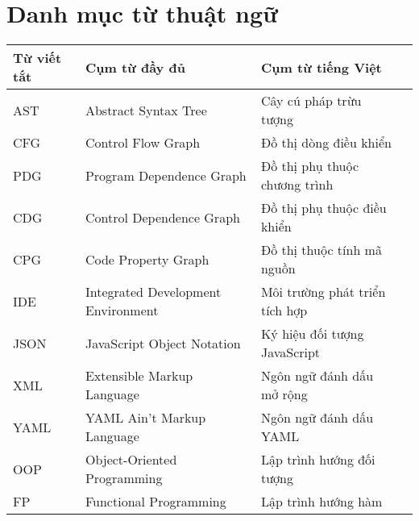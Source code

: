\chapter*{Danh mục từ thuật ngữ}


\begin{table}[h]
\begin{tabularx}{\textwidth}{|l|l|X|X|}
\hline
\textbf{Từ viết tắt} & \textbf{Cụm từ đầy đủ} & \textbf{Cụm từ tiếng Việt} \\
\hline
AST & Abstract Syntax Tree & Cây cú pháp trừu tượng \\
\hline
CFG & Control Flow Graph & Đồ thị dòng điều khiển \\
\hline
PDG & Program Dependence Graph & Đồ thị phụ thuộc chương trình \\
\hline
CDG & Control Dependence Graph & Đồ thị phụ thuộc điều khiển \\
\hline
CPG & Code Property Graph & Đồ thị thuộc tính mã nguồn \\
\hline
IDE & Integrated Development Environment & Môi trường phát triển tích hợp \\
\hline
JSON & JavaScript Object Notation & Ký hiệu đối tượng JavaScript \\
\hline
XML & Extensible Markup Language & Ngôn ngữ đánh dấu mở rộng \\
\hline
YAML & YAML Ain't Markup Language & Ngôn ngữ đánh dấu YAML \\
\hline
OOP & Object-Oriented Programming & Lập trình hướng đối tượng \\
\hline
FP & Functional Programming & Lập trình hướng hàm \\
\hline
\end{tabularx}
\end{table}